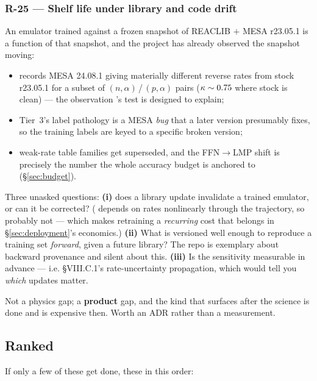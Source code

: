 \subsubsection{R-25 --- Shelf life under library and code drift}
\label{sec:r25}

An emulator trained against a frozen snapshot of REACLIB $+$ MESA r23.05.1 is a
function of that snapshot, and the project has already observed the snapshot
moving:

\begin{itemize}
\item {} records MESA 24.08.1 giving materially different
  reverse rates from stock r23.05.1 for a subset of
  $(n,\alpha)$\,/\,$(p,\alpha)$ pairs ($\kappa \sim 0.75$ where stock is clean) ---
  the observation 's test is designed to explain;
\item Tier~3's label pathology is a MESA \emph{bug} that a later version
  presumably fixes, so the training labels are keyed to a specific broken
  version;
\item weak-rate table families get superseded, and the FFN$\to$LMP shift is
  precisely the number the whole accuracy budget is anchored to
  (\S\ref{sec:budget}).
\end{itemize}

Three unasked questions: \textbf{(i)} does a library update invalidate a trained
emulator, or can it be corrected? (\Phifl{} depends on rates nonlinearly through
the trajectory, so probably not --- which makes retraining a \emph{recurring}
cost that belongs in \S\ref{sec:deployment}'s economics.) \textbf{(ii)} What is
versioned well enough to reproduce a training set \emph{forward}, given a future
library? The repo is exemplary about backward provenance and silent about this.
\textbf{(iii)} Is the sensitivity measurable in advance --- i.e.
 \S VIII.C.1's rate-uncertainty propagation, which would tell you
\emph{which} updates matter.

Not a physics gap; a \textbf{product} gap, and the kind that surfaces after the
science is done and is expensive then. Worth an ADR rather than a measurement.

\subsection{Ranked}
\label{sec:ranked}

If only a few of these get done, these in this order:


